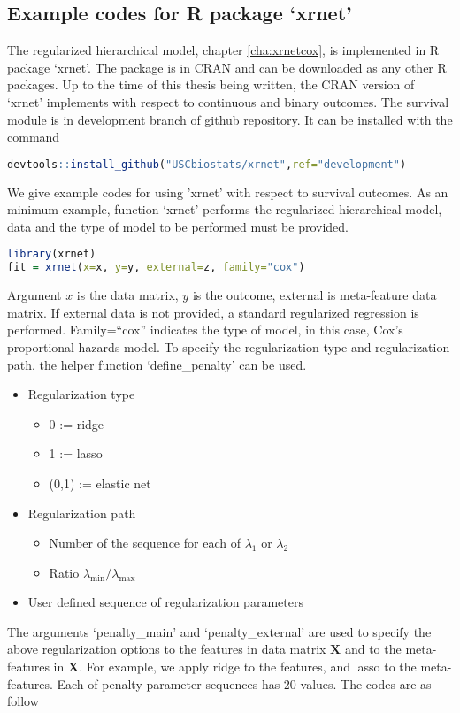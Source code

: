 \subsection{Example codes for R package `xrnet'}
\label{a.3}
The regularized hierarchical model, chapter \ref{cha:xrnetcox}, is implemented in R package `xrnet'. The package is in CRAN and can be downloaded as any other R packages. Up to the time of this thesis being written, the CRAN version of `xrnet' implements with respect to continuous and binary outcomes. The survival module is in development branch of github repository. It can be installed with the command

\begin{lstlisting}[language=R]
devtools::install_github("USCbiostats/xrnet",ref="development")
\end{lstlisting}

We give example codes for using 'xrnet' with respect to survival outcomes. As an minimum example, function `xrnet' performs the regularized hierarchical model, data and the type of model to be performed must be provided.

\begin{lstlisting}[language=R]
library(xrnet)
fit = xrnet(x=x, y=y, external=z, family="cox")
\end{lstlisting}
Argument $x$ is the data matrix, $y$ is the outcome, external is meta-feature data matrix. If external data is not provided, a standard regularized regression is performed. Family=``cox'' indicates the type of model, in this case, Cox's proportional hazards model. To specify the regularization type and regularization path, the helper function `define\_penalty' can be used. 
\begin{itemize}
    \item Regularization type
    \begin{itemize}
        \item 0 := ridge
        \item 1 := lasso
        \item (0,1) := elastic net
    \end{itemize}
    \item Regularization path
    \begin{itemize}
        \item Number of the sequence for each of $\lambda_1$ or $\lambda_2$
        \item Ratio $\lambda_{\min}/\lambda_{\max}$
    \end{itemize}
    \item User defined sequence of regularization parameters
\end{itemize}
The arguments `penalty\_main' and `penalty\_external' are used to specify the above regularization options to the features in data matrix $\bm{X}$ and to the meta-features in $\bm{X}$. For example, we apply ridge to the features, and lasso to the meta-features. Each of penalty parameter sequences has 20 values. The codes are as follow

